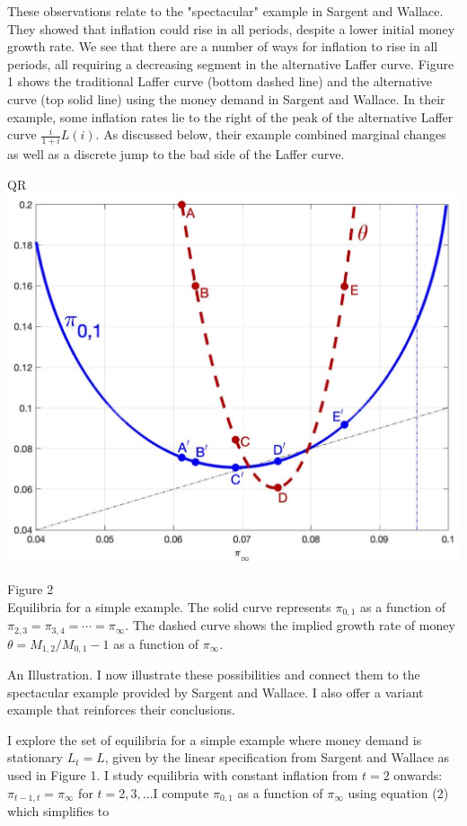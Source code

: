 \documentclass[10pt]{article}
\begin{document}
These observations relate to the "spectacular" example in Sargent and Wallace. They showed that inflation could rise in all periods, despite a lower initial money growth rate. We see that there are a number of ways for inflation to rise in all periods, all requiring a decreasing segment in the alternative Laffer curve. Figure 1 shows the traditional Laffer curve (bottom dashed line) and the alternative curve (top solid line) using the money demand in Sargent and Wallace. In their example, some inflation rates lie to the right of the peak of the alternative Laffer curve $\frac{i}{1+i} L(i)$. As discussed below, their example combined marginal changes as well as a discrete jump to the bad side of the Laffer curve.

QR\\
\includegraphics[max width=\textwidth, center]{2024_12_20_6e24ae1385cdc0ea3304g-09}

Figure 2\\
Equilibria for a simple example. The solid curve represents $\pi_{0,1}$ as a function of $\pi_{2,3}=\pi_{3,4}=\cdots=\pi_{\infty}$. The dashed curve shows the implied growth rate of money $\theta=M_{1,2} / M_{0,1}-1$ as a function of $\pi_{\infty}$.

An Illustration. I now illustrate these possibilities and connect them to the spectacular example provided by Sargent and Wallace. I also offer a variant example that reinforces their conclusions.

I explore the set of equilibria for a simple example where money demand is stationary $L_{t}=L$, given by the linear specification from Sargent and Wallace as used in Figure 1. I study equilibria with constant inflation from $t=2$ onwards: $\pi_{t-1, t}=\pi_{\infty}$ for $t=2,3, \ldots \mathrm{I}$ compute $\pi_{0,1}$ as a function of $\pi_{\infty}$ using equation (2) which simplifies to
\end{document}
